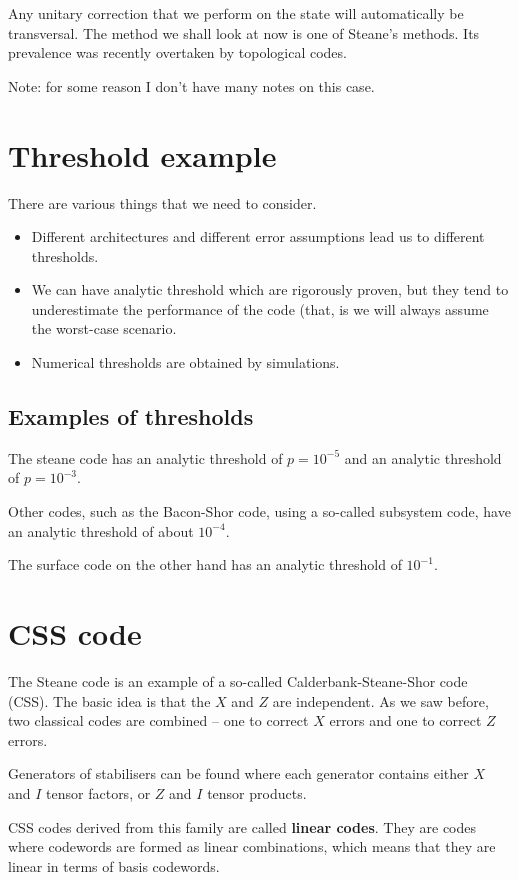 Any unitary correction that we perform on  the state will automatically be transversal. The method we shall look at now is one of Steane's methods. Its prevalence was recently overtaken by topological codes. 

Note: for some reason I don't have many notes on this case. 

\section{Threshold example}
There are various things that we need to consider. 
\begin{itemize}
\item Different architectures and different error assumptions lead us to different thresholds. 
\item We can have analytic threshold which are rigorously proven, but they tend to underestimate the performance of the code (that, is we will always assume the worst-case scenario. 
\item Numerical thresholds are obtained by simulations. 
\end{itemize}


\subsection{Examples of thresholds}
The steane code has an analytic threshold of $ p = 10^{-5}$ and an analytic threshold of $p = 10^{-3}$. 

Other codes, such as the Bacon-Shor code, using a so-called subsystem code, have an analytic threshold of about $10^{-4}$. 

The surface code on the other hand has an analytic threshold of $10^{-1}$. 

\section{CSS code}
The Steane code is an example of a so-called Calderbank-Steane-Shor code (CSS). The basic idea is that the $X$ and $Z$ are independent. As we saw before, two classical codes are combined -- one to correct $X$ errors and one to correct $Z$ errors. 

Generators of stabilisers can be found where each generator contains either $X$ and $I$ tensor factors, or $Z$ and $I$ tensor products. 

CSS codes derived from this family are called \textbf{linear codes}. They are codes where codewords are formed as linear combinations, which means that they are linear in terms of basis codewords. 

